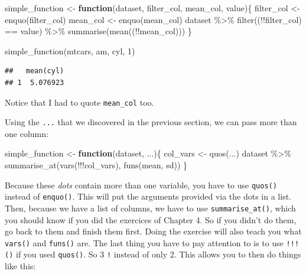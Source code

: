 \documentclass[
]{article}
\newenvironment{Shaded}{\begin{snugshade}}{\end{snugshade}}
\newcommand{\ControlFlowTok}[1]{\textcolor[rgb]{0.13,0.29,0.53}{\textbf{#1}}}
\newcommand{\DecValTok}[1]{\textcolor[rgb]{0.00,0.00,0.81}{#1}}
\newcommand{\FunctionTok}[1]{\textcolor[rgb]{0.00,0.00,0.00}{#1}}
\newcommand{\NormalTok}[1]{#1}
\newcommand{\OtherTok}[1]{\textcolor[rgb]{0.56,0.35,0.01}{#1}}
\newcommand{\SpecialCharTok}[1]{\textcolor[rgb]{0.00,0.00,0.00}{#1}}
\begin{document}
\begin{Shaded}
\begin{Highlighting}[]
\NormalTok{simple\_function }\OtherTok{\textless{}{-}} \ControlFlowTok{function}\NormalTok{(dataset, filter\_col, mean\_col, value)\{}
\NormalTok{  filter\_col }\OtherTok{\textless{}{-}} \FunctionTok{enquo}\NormalTok{(filter\_col)}
\NormalTok{  mean\_col }\OtherTok{\textless{}{-}} \FunctionTok{enquo}\NormalTok{(mean\_col)}
\NormalTok{  dataset }\SpecialCharTok{\%\textgreater{}\%}
    \FunctionTok{filter}\NormalTok{((}\SpecialCharTok{!!}\NormalTok{filter\_col) }\SpecialCharTok{==}\NormalTok{ value) }\SpecialCharTok{\%\textgreater{}\%}
    \FunctionTok{summarise}\NormalTok{(}\FunctionTok{mean}\NormalTok{((}\SpecialCharTok{!!}\NormalTok{mean\_col)))}
\NormalTok{\}}


\FunctionTok{simple\_function}\NormalTok{(mtcars, am, cyl, }\DecValTok{1}\NormalTok{)}
\end{Highlighting}
\end{Shaded}

\begin{verbatim}
##   mean(cyl)
## 1  5.076923
\end{verbatim}

Notice that I had to quote \texttt{mean\_col} too.

Using the \texttt{...} that we discovered in the previous section, we can pass more than one column:

\begin{Shaded}
\begin{Highlighting}[]
\NormalTok{simple\_function }\OtherTok{\textless{}{-}} \ControlFlowTok{function}\NormalTok{(dataset, ...)\{}
\NormalTok{  col\_vars }\OtherTok{\textless{}{-}} \FunctionTok{quos}\NormalTok{(...)}
\NormalTok{  dataset }\SpecialCharTok{\%\textgreater{}\%}
    \FunctionTok{summarise\_at}\NormalTok{(}\FunctionTok{vars}\NormalTok{(}\SpecialCharTok{!!!}\NormalTok{col\_vars), }\FunctionTok{funs}\NormalTok{(mean, sd))}
\NormalTok{\}}
\end{Highlighting}
\end{Shaded}

Because these \emph{dots} contain more than one variable, you have to use \texttt{quos()} instead of \texttt{enquo()}.
This will put the arguments provided via the dots in a list. Then, because we have a list of
columns, we have to use \texttt{summarise\_at()}, which you should know if you did the exercices of
Chapter 4. So if you didn't do them, go back to them and finish them first. Doing the exercise will
also teach you what \texttt{vars()} and \texttt{funs()} are. The last thing you have to pay attention to is to
use \texttt{!!!()} if you used \texttt{quos()}. So 3 \texttt{!} instead of only 2. This allows you to then do things
like this:
\end{document}
